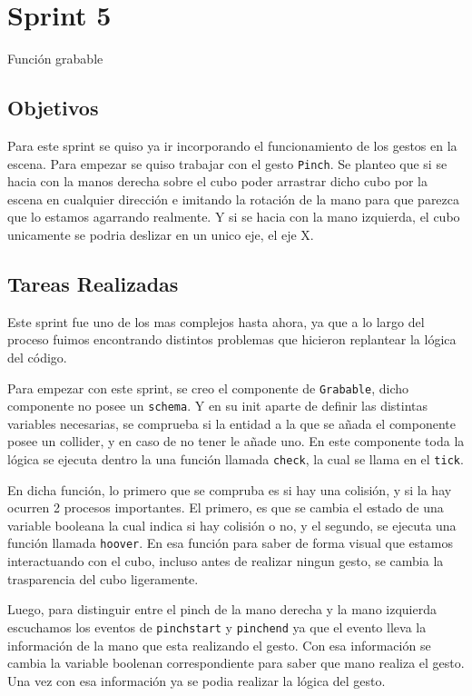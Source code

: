 \documentclass[a4paper, 12pt]{book}
\begin{document}
\section{Sprint 5}
\label{sec:sprint5}
Función grabable

\subsection{Objetivos}
\label{subsec:objetivo-principal5}
Para este sprint se quiso ya ir incorporando el funcionamiento de los gestos en la escena. Para empezar se quiso trabajar con el gesto \texttt{Pinch}. Se planteo que si se hacia con la manos derecha sobre el cubo poder 
arrastrar dicho cubo por la escena en cualquier dirección e imitando la rotación de la mano para que parezca que lo estamos agarrando realmente. Y si se hacia con la mano izquierda, el cubo unicamente se podria deslizar en un unico eje, el eje X.

\subsection{Tareas Realizadas}
\label{subsec:implementacion5}
Este sprint fue uno de los mas complejos hasta ahora, ya que a lo largo del proceso fuimos encontrando distintos problemas que hicieron replantear la lógica del código. 

Para empezar con este sprint, se creo el componente de \texttt{Grabable}, dicho componente no posee un \texttt{schema}. Y en su init aparte de definir las distintas variables necesarias, se comprueba si la entidad a la que se añada el componente posee un collider, y en caso de no tener le añade uno.
En este componente toda la lógica se ejecuta dentro la una función llamada \texttt{check}, la cual se llama en el \texttt{tick}. 

En dicha función, lo primero que se compruba es si hay una colisión, y si la hay ocurren 2 procesos importantes. El primero, es que se cambia el estado de una variable booleana la cual indica si hay colisión o no, y el segundo, se ejecuta una función llamada \texttt{hoover}. En esa función para saber de forma visual que estamos interactuando con el cubo, incluso antes de realizar ningun gesto, se cambia la trasparencia del cubo ligeramente.

Luego, para distinguir entre el pinch de la mano derecha y la mano izquierda escuchamos los eventos de \texttt{pinchstart} y \texttt{pinchend} ya que el evento lleva la información de la mano que esta realizando el gesto. Con esa información se cambia la variable boolenan correspondiente para saber que mano realiza el gesto. Una vez con esa información ya se podia realizar la lógica del gesto.
\end{document}
